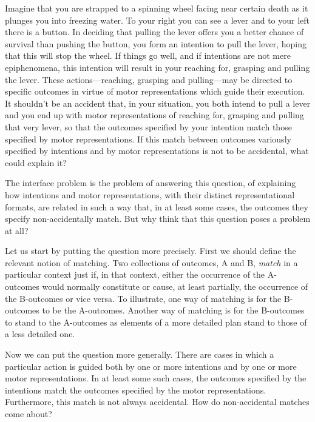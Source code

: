 \documentclass[12pt,\papersize]{extarticle}
\begin{document}
Imagine that you are strapped to a spinning wheel facing near certain death as it plunges you into freezing water. To your right you can see a lever and to your left there is a button. In deciding that pulling the lever offers you a better chance of survival than pushing the button, you form an intention to pull the lever, hoping that this will stop the wheel. If things go well, and if intentions are not mere epiphenomena, this intention will result in your reaching for, grasping and pulling the lever. These actions---reaching, grasping and pulling---may be directed to specific outcomes in virtue of motor representations which guide their execution. It shouldn't be an accident that, in your situation, you both intend to pull a lever and you end up with motor representations of reaching for, grasping and pulling that very lever, so that the outcomes specified by your intention match those specified by motor representations. If this match between outcomes variously specified by intentions and by motor representations is not to be accidental, what could explain it?  

The interface problem is the problem of answering this question, of explaining how intentions and motor representations, with their distinct representational formats, are related in such a way that, in at least some cases, the outcomes they specify non-accidentally match. But why think that this question poses a problem at all?  

Let us start by putting the question more precisely.  First we should define the relevant notion of matching. Two collections of outcomes, A and B, \emph{match} in a particular context just if, in that context, either the occurrence of the A-outcomes would normally constitute or cause, at least partially, the occurrence of the B-outcomes or vice versa. To illustrate, one way of matching is for the B-outcomes to be the A-outcomes. Another way of matching is for the B-outcomes to stand to the A-outcomes as elements of a more detailed plan stand to those of a less detailed one.

Now we can put the question more generally. There are cases in which a particular action is guided both by one or more intentions and by one or more motor representations. In at least some such cases, the outcomes specified by the intentions match the outcomes specified by the motor representations. Furthermore, this match is not always accidental. How do non-accidental matches come about?  
\end{document}
